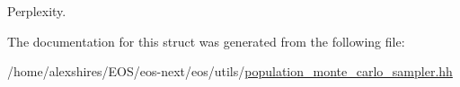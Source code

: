 Perplexity. 

The documentation for this struct was generated from the following file:\begin{DoxyCompactItemize}
\item 
/home/alexshires/EOS/eos-\/next/eos/utils/\hyperlink{population__monte__carlo__sampler_8hh}{population\_\-monte\_\-carlo\_\-sampler.hh}\end{DoxyCompactItemize}
